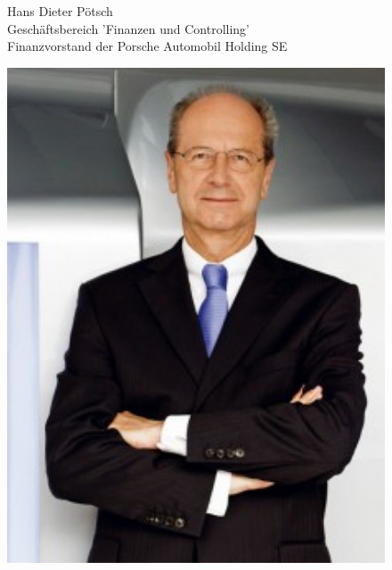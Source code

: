 \documentclass[12pt]{article}
\begin{document}
\begin{figure}[here!]
	\centering
	\begin{minipage}[h]{0.65\textwidth}
		Hans Dieter Pötsch\\
		Geschäftsbereich 'Finanzen und Controlling'\\
		Finanzvorstand der Porsche Automobil Holding SE
	\end{minipage}
	\begin{minipage}[h]{0.10\textwidth}
		\hspace{1cm} 
	\end{minipage}
	\begin{minipage}[h]{0.20\textwidth}
		\centering
		\includegraphics[width=1.0\textwidth]{images/HansPoetsch.jpg}
		\label{fig:vorstandvw7}
	\end{minipage}
\end{figure}
\end{document}
